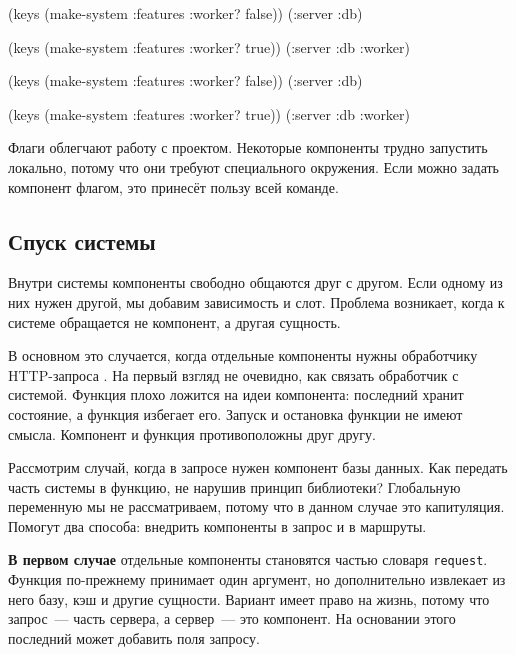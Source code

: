 \ifnarrow

\begin{english}
  \begin{clojure}
(keys (make-system
        {:features {:worker? false}}))
(:server :db)

(keys (make-system
        {:features {:worker? true}}))
(:server :db :worker)
  \end{clojure}
\end{english}

\else

\begin{english}
  \begin{clojure}
(keys (make-system {:features {:worker? false}}))
(:server :db)

(keys (make-system {:features {:worker? true}}))
(:server :db :worker)
  \end{clojure}
\end{english}

\fi

Флаги облегчают работу с проектом. Некоторые компоненты трудно запустить
локально, потому что они требуют специального окружения. Если можно задать
компонент флагом, это принесёт пользу всей команде.

\subsection{Спуск системы}


Внутри системы компоненты свободно общаются друг с другом. Если одному из них
нужен другой, мы добавим зависимость и слот. Проблема возникает, когда к системе
обращается не компонент, а другая сущность.

В основном это случается, когда отдельные компоненты нужны обработчику
HTTP-запроса . На первый взгляд не очевидно, как связать
обработчик с системой. Функция плохо ложится на идеи компонента: последний
хранит состояние, а функция избегает его. Запуск и остановка функции не имеют
смысла. Компонент и функция противоположны друг другу.

Рассмотрим случай, когда в запросе нужен компонент базы данных. Как передать
часть системы в функцию, не нарушив принцип библиотеки? Глобальную переменную мы
не рассматриваем, потому что в данном случае это капитуляция. Помогут два
способа: внедрить компоненты в запрос и в маршруты.

\textbf{В первом случае} отдельные компоненты становятся частью словаря
\verb|request|. Функция по-прежнему принимает один аргумент, но дополнительно
извлекает из него базу, кэш и другие сущности. Вариант имеет право на жизнь,
потому что запрос~--- часть сервера, а сервер~--- это компонент. На основании
этого последний может добавить поля запросу.

